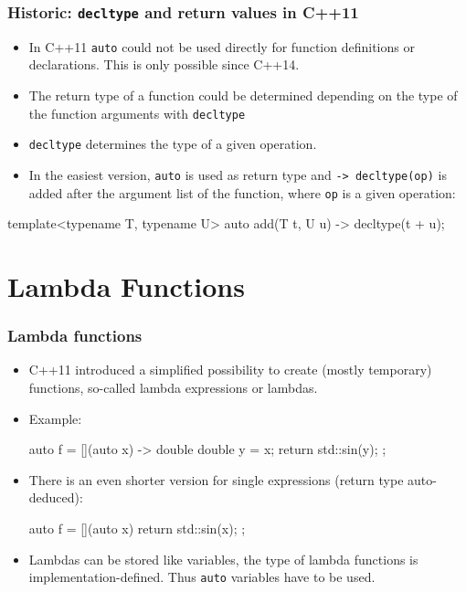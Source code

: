 \documentclass[aspectratio=169,ignorenonframetext,11pt]{beamer}
\def\inline{\lstinline[basicstyle=\small\ttfamily]}
\begin{document}
\begin{frame}[fragile]
\frametitle{Historic: \lstinline!decltype! and return values in C++11}
\begin{itemize}
\item In C++11 \inline!auto! could not be used directly for function definitions or declarations. This is only possible since C++14.
\item The return type of a function could be determined depending on the type of the function arguments with \inline!decltype!
\item \inline!decltype! determines the type of a given operation.
\item In the easiest version, \inline!auto! is used as return type and \inline!-> decltype(op)! is added after the argument list of the function, where \inline!op! is a given operation:
\end{itemize}
\begin{cppcode}
template<typename T, typename U>
auto add(T t, U u) -> decltype(t + u);
\end{cppcode}

\end{frame}


\section{Lambda Functions}

\begin{frame}[fragile]
  \frametitle<presentation>{Lambda functions}
  \begin{itemize}
  \item C++11 introduced a simplified possibility to create (mostly temporary) functions, so-called lambda expressions or lambdas.
  \item Example:
\begin{cppcode}
auto f = [](auto x) -> double 
{
  double y = x;
  return std::sin(y);
};
\end{cppcode}
\item There is an even shorter version for single expressions (return type auto-deduced):
\begin{cppcode}
auto f = [](auto x) { return std::sin(x); };
\end{cppcode}
\item Lambdas can be stored like variables, the type of lambda functions is implementation-defined. Thus \inline!auto! variables have to be used.
  \end{itemize}
\end{frame}
\end{document}
